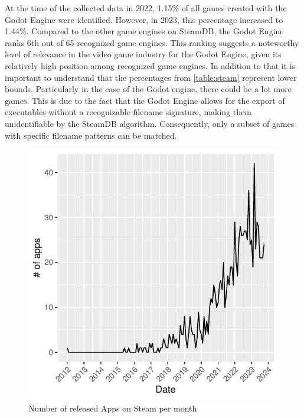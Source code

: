 At the time of the collected data in 2022, 1.15\% of all games created with the Godot Engine were identified.
However, in 2023, this percentage increased to 1.44\%.
Compared to the other game engines on SteamDB, the Godot Engine ranks 6th out of 65 recognized game engines.
This ranking suggests a noteworthy level of relevance in the video game industry for the Godot Engine, given its relatively high position among recognized game engines.
In addition to that it is important to understand that the percentages from \autoref{table:steam} represent lower bounds.
Particularly in the case of the Godot engine, there could be a lot more games.
This is due to the fact that the Godot Engine allows for the export of executables without a recognizable filename signature, making them unidentifiable by the SteamDB algorithm.
Consequently, only a subset of games with specific filename patterns can be matched. \\

\begin{figure}[ht!]
    \begin{center}
        \includegraphics[width=1\columnwidth]{figures/godot-graph.pdf}
        \caption{\label{fig:godot-graph} Number of released Apps on Steam per month}
    \end{center}
\end{figure}

